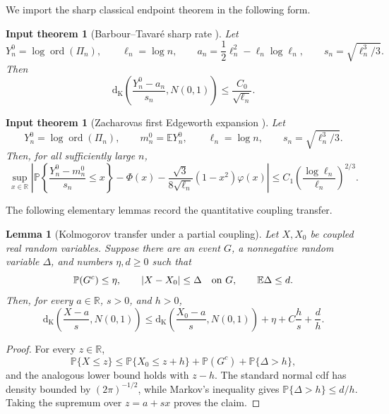 \documentclass[11pt]{article}
\newtheorem{lemma}[theorem]{Lemma}
\newtheorem{inputtheorem}[theorem]{Input theorem}
\theoremstyle{definition}
\theoremstyle{remark}
\newcommand{\Pp}{\mathbb P}
\newcommand{\Ee}{\mathbb E}
\newcommand{\ord}{\operatorname{ord}}
\newcommand{\Kol}{\mathrm d_{\mathrm K}}
\newcommand{\R}{\mathbb R}
\begin{document}
We import the sharp classical endpoint theorem in the following form.

\begin{inputtheorem}[Barbour--Tavar\'e sharp rate
\cite{BarbourTavare1994,Zacharovas2009}]
\label{input:BT}
Let
\[
 Y_n^0=\log\ord(\Pi_n),
 \qquad
 \ell_n=\log n,
 \qquad
 a_n=\frac12\ell_n^2-\ell_n\log\ell_n,
 \qquad
 s_n=\sqrt{\ell_n^3/3}.
\]
Then
\begin{equation}\label{eq:BT}
 \Kol\!\left(\frac{Y_n^0-a_n}{s_n},N(0,1)\right)
 \le \frac{C_0}{\sqrt{\ell_n}}.
\end{equation}
\end{inputtheorem}

\begin{inputtheorem}[Zacharovas first Edgeworth expansion
\cite{Zacharovas2009}]
\label{input:Zacharovas}
Let
\[
 Y_n^0=\log\ord(\Pi_n),\qquad
 m_n^0=\Ee Y_n^0,\qquad
 \ell_n=\log n,\qquad
 s_n=\sqrt{\ell_n^3/3}.
\]
Then, for all sufficiently large $n$,
\begin{equation}\label{eq:Zacharovas}
 \sup_{x\in\R}\left|
 \Pp\left\{\frac{Y_n^0-m_n^0}{s_n}\le x\right\}
 -\Phi(x)
 -\frac{\sqrt3}{8\sqrt{\ell_n}}(1-x^2)\varphi(x)
 \right|
 \le
 C_1\left(\frac{\log\ell_n}{\ell_n}\right)^{2/3}.
\end{equation}
\end{inputtheorem}

The following elementary lemmas record the quantitative coupling transfer.

\begin{lemma}[Kolmogorov transfer under a partial coupling]
\label{lem:kol-coupling}
Let $X,X_0$ be coupled real random variables.  Suppose there are an event
$G$, a nonnegative random variable $\Delta$, and numbers $\eta,d\ge0$ such
that
\[
 \Pp(G^c)\le\eta,
 \qquad
 |X-X_0|\le\Delta\quad\hbox{on }G,
 \qquad
 \Ee\Delta\le d.
\]
Then, for every $a\in\R$, $s>0$, and $h>0$,
\begin{equation}\label{eq:kol-coupling}
 \Kol\!\left(\frac{X-a}{s},N(0,1)\right)
 \le
 \Kol\!\left(\frac{X_0-a}{s},N(0,1)\right)
 +\eta+C\frac{h}{s}+\frac{d}{h}.
\end{equation}
\end{lemma}

\begin{proof}
For every $z\in\R$,
\[
 \Pp\{X\le z\}
 \le
 \Pp\{X_0\le z+h\}+\Pp(G^c)+\Pp\{\Delta>h\},
\]
and the analogous lower bound holds with $z-h$.  The standard normal
cdf has density bounded by $(2\pi)^{-1/2}$, while Markov's inequality gives
$\Pp\{\Delta>h\}\le d/h$.  Taking the supremum over
$z=a+sx$ proves the claim.
\end{proof}
\end{document}
